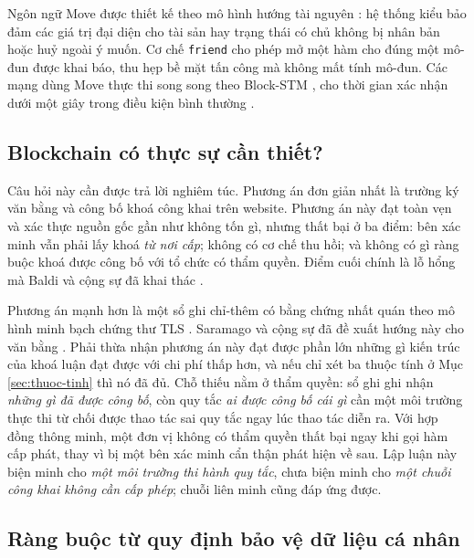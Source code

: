 Ngôn ngữ Move được thiết kế theo mô hình hướng tài nguyên \cite{Blackshear2019Move}: hệ thống kiểu bảo đảm các giá trị đại diện cho tài sản hay trạng thái có chủ không bị nhân bản hoặc huỷ ngoài ý muốn. Cơ chế \texttt{friend} cho phép mở một hàm cho đúng một mô-đun được khai báo, thu hẹp bề mặt tấn công mà không mất tính mô-đun. Các mạng dùng Move thực thi song song theo Block-STM \cite{Gelashvili2023}, cho thời gian xác nhận dưới một giây trong điều kiện bình thường \cite{Aptos2022}.

\subsection{Blockchain có thực sự cần thiết?}

Câu hỏi này cần được trả lời nghiêm túc. Phương án đơn giản nhất là trường ký văn bằng và công bố khoá công khai trên website. Phương án này đạt toàn vẹn và xác thực nguồn gốc gần như không tốn gì, nhưng thất bại ở ba điểm: bên xác minh vẫn phải lấy khoá \emph{từ nơi cấp}; không có cơ chế thu hồi; và không có gì ràng buộc khoá được công bố với tổ chức có thẩm quyền. Điểm cuối chính là lỗ hổng mà Baldi và cộng sự đã khai thác \cite{Baldi2019}.

Phương án mạnh hơn là một sổ ghi chỉ-thêm có bằng chứng nhất quán theo mô hình minh bạch chứng thư TLS \cite{RFC6962}. Saramago và cộng sự đã đề xuất hướng này cho văn bằng \cite{Saramago2021}. Phải thừa nhận phương án này đạt được phần lớn những gì kiến trúc của khoá luận đạt được với chi phí thấp hơn, và nếu chỉ xét ba thuộc tính ở Mục \ref{sec:thuoc-tinh} thì nó đã đủ. Chỗ thiếu nằm ở thẩm quyền: sổ ghi ghi nhận \emph{những gì đã được công bố}, còn quy tắc \emph{ai được công bố cái gì} cần một môi trường thực thi từ chối được thao tác sai quy tắc ngay lúc thao tác diễn ra. Với hợp đồng thông minh, một đơn vị không có thẩm quyền thất bại ngay khi gọi hàm cấp phát, thay vì bị một bên xác minh cẩn thận phát hiện về sau. Lập luận này biện minh cho \emph{một môi trường thi hành quy tắc}, chưa biện minh cho \emph{một chuỗi công khai không cần cấp phép}; chuỗi liên minh cũng đáp ứng được.

\subsection{Ràng buộc từ quy định bảo vệ dữ liệu cá nhân}

